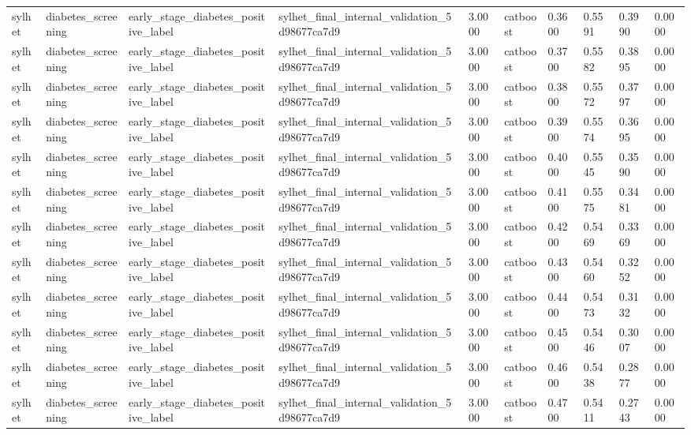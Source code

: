 \begin{tabular}{llllllllll}
sylhet & diabetes\_screening & early\_stage\_diabetes\_positive\_label & sylhet\_final\_internal\_validation\_5d98677ca7d9 & 3.0000 & catboost & 0.3600 & 0.5591 & 0.3990 & 0.0000 \\
sylhet & diabetes\_screening & early\_stage\_diabetes\_positive\_label & sylhet\_final\_internal\_validation\_5d98677ca7d9 & 3.0000 & catboost & 0.3700 & 0.5582 & 0.3895 & 0.0000 \\
sylhet & diabetes\_screening & early\_stage\_diabetes\_positive\_label & sylhet\_final\_internal\_validation\_5d98677ca7d9 & 3.0000 & catboost & 0.3800 & 0.5572 & 0.3797 & 0.0000 \\
sylhet & diabetes\_screening & early\_stage\_diabetes\_positive\_label & sylhet\_final\_internal\_validation\_5d98677ca7d9 & 3.0000 & catboost & 0.3900 & 0.5574 & 0.3695 & 0.0000 \\
sylhet & diabetes\_screening & early\_stage\_diabetes\_positive\_label & sylhet\_final\_internal\_validation\_5d98677ca7d9 & 3.0000 & catboost & 0.4000 & 0.5545 & 0.3590 & 0.0000 \\
sylhet & diabetes\_screening & early\_stage\_diabetes\_positive\_label & sylhet\_final\_internal\_validation\_5d98677ca7d9 & 3.0000 & catboost & 0.4100 & 0.5575 & 0.3481 & 0.0000 \\
sylhet & diabetes\_screening & early\_stage\_diabetes\_positive\_label & sylhet\_final\_internal\_validation\_5d98677ca7d9 & 3.0000 & catboost & 0.4200 & 0.5469 & 0.3369 & 0.0000 \\
sylhet & diabetes\_screening & early\_stage\_diabetes\_positive\_label & sylhet\_final\_internal\_validation\_5d98677ca7d9 & 3.0000 & catboost & 0.4300 & 0.5460 & 0.3252 & 0.0000 \\
sylhet & diabetes\_screening & early\_stage\_diabetes\_positive\_label & sylhet\_final\_internal\_validation\_5d98677ca7d9 & 3.0000 & catboost & 0.4400 & 0.5473 & 0.3132 & 0.0000 \\
sylhet & diabetes\_screening & early\_stage\_diabetes\_positive\_label & sylhet\_final\_internal\_validation\_5d98677ca7d9 & 3.0000 & catboost & 0.4500 & 0.5446 & 0.3007 & 0.0000 \\
sylhet & diabetes\_screening & early\_stage\_diabetes\_positive\_label & sylhet\_final\_internal\_validation\_5d98677ca7d9 & 3.0000 & catboost & 0.4600 & 0.5438 & 0.2877 & 0.0000 \\
sylhet & diabetes\_screening & early\_stage\_diabetes\_positive\_label & sylhet\_final\_internal\_validation\_5d98677ca7d9 & 3.0000 & catboost & 0.4700 & 0.5411 & 0.2743 & 0.0000 \\

\end{tabular}
